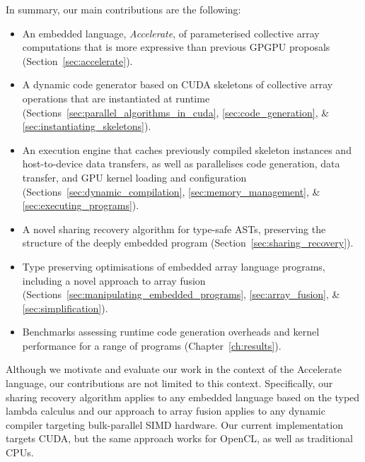 In summary, our main contributions are the following:
%
\begin{itemize}
    \item An embedded language, \emph{Accelerate}, of parameterised collective
        array computations that is more expressive than previous GPGPU proposals
        (Section~\ref{sec:accelerate}).

    \item A dynamic code generator based on CUDA skeletons of collective array
        operations that are instantiated at runtime
        (Sections~\ref{sec:parallel_algorithms_in_cuda},
        \ref{sec:code_generation}, \&
        \ref{sec:instantiating_skeletons}).

    \item An execution engine that caches previously compiled skeleton instances
        and host-to-device data transfers, as well as parallelises code
        generation, data transfer, and GPU kernel loading and configuration
        (Sections~\ref{sec:dynamic_compilation},
        \ref{sec:memory_management}, \&
        \ref{sec:executing_programs}).

    \item A novel sharing recovery algorithm for type-safe ASTs, preserving the
        structure of the deeply embedded program
        (Section~\ref{sec:sharing_recovery}).

    \item Type preserving optimisations of embedded array language programs,
        including a novel approach to array fusion %
        (Sections~\ref{sec:manipulating_embedded_programs},
        \ref{sec:array_fusion}, \&
        \ref{sec:simplification}).

    \item Benchmarks assessing runtime code generation overheads and kernel
        performance for a range of programs (Chapter~\ref{ch:results}).
\end{itemize}

Although we motivate and evaluate our work in the context of the Accelerate
language, our contributions are not limited to this context. Specifically, our
sharing recovery algorithm applies to any embedded language based on the typed
lambda calculus and our approach to array fusion applies to any dynamic compiler
targeting bulk-parallel SIMD hardware. Our current implementation targets CUDA,
but the same approach works for OpenCL, as well as traditional CPUs.

